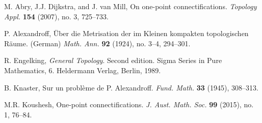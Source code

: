 \documentclass{amsart}
\newenvironment{proof of claim}{\noindent\textbf{Proof of the claim.}}{\hfill{$\square$}\newline}
\theoremstyle{definition}
\theoremstyle{remark}
\numberwithin{equation}{section}
\begin{document}
\begin{thebibliography}{10}

 M. Abry, J.J. Dijkstra, and J. van Mill, On one-point connectifications. \textit{Topology Appl.} \textbf{154} (2007), no. 3, 725--733.

 P. Alexandroff, \"{U}ber die Metrisation der im Kleinen kompakten topologischen R\"{a}ume. (German) \textit{Math. Ann.} \textbf{92} (1924), no. 3--4, 294--301.

 R. Engelking, \textit{General Topology}. Second edition. Sigma Series in Pure Mathematics, 6. Heldermann Verlag, Berlin, 1989.

 B. Knaster, Sur un probl\`{e}me de P. Alexandroff. \textit{Fund. Math.} \textbf{33} (1945), 308--313.

 M.R. Koushesh, One-point connectifications. \textit{J. Aust. Math. Soc.} \textbf{99} (2015), no. 1, 76--84.

\end{thebibliography}
\end{document}
